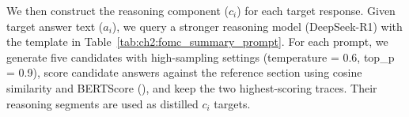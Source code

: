 %
We then construct the reasoning component ($c_i$) for each target response. Given target answer text ($a_i$), we query a stronger reasoning model (DeepSeek-R1) with the template in Table~\ref{tab:ch2:fomc_summary_prompt}. For each prompt, we generate five candidates with high-sampling settings (temperature = 0.6, top\_p = 0.9), score candidate answers against the reference section using cosine similarity and BERTScore (\cite{zhang2019bertscore}), and keep the two highest-scoring traces. Their reasoning segments are used as distilled $c_i$ targets.



